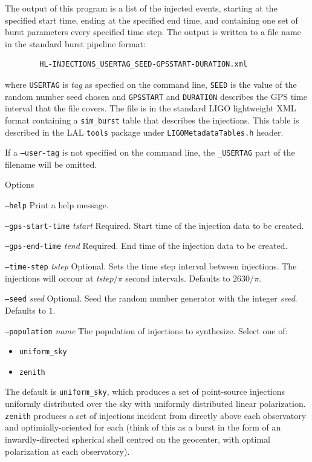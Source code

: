 \documentclass[10pt]{article}
\newcommand{\option}[1]{\texttt{#1}}
\newcommand{\parm}[1]{\textit{#1}}
\newenvironment{entry}%
{\begin{list}{}{\renewcommand{\makelabel}[1]%
{\parbox[b]{\labelwidth}{\makebox[0pt][l]{\textbf{##1}}\\}}%
\setlength{\labelwidth}{1em}%
\setlength{\labelsep}{1em}%
\setlength{\leftmargin}{2em}%
\setlength{\topsep}{\medskipamount}%
\setlength{\itemsep}{\medskipamount}%
\setlength{\parsep}{\medskipamount}%
\setlength{\listparindent}{0pt}}}
{\end{list}}
\begin{document}
\begin{entry}
The output of this program  is  a  list  of  the  injected events, starting
at  the specified start time, ending at the specified end time, and
containing one set  of burst parameters every specified time step.  The
output is written to a file name in the standard burst pipeline format:
\begin{center}
\begin{verbatim}
        HL-INJECTIONS_USERTAG_SEED-GPSSTART-DURATION.xml
\end{verbatim}
\end{center}
where \verb$USERTAG$ is \parm{tag} as specfied on the command line,
\verb$SEED$ is the  value  of  the random number seed chosen and
\verb$GPSSTART$ and \verb$DURATION$ describes the GPS time interval that
the file covers. The file is in the standard LIGO lightweight XML format
containing a \texttt{sim\_burst} table that describes the injections.  This
table is described in the LAL \texttt{tools} package under
\texttt{LIGOMetadataTables.h} header.  

If a \option{--user-tag} is not specified on the command line, the
\texttt{\_USERTAG} part of the filename will be omitted.

\item[Options]\leavevmode
\begin{entry}
\item[\option{--help}] Print a help message.

\item[\option{--gps-start-time} \parm{tstart}]
Required.  Start time of the injection data to be created.

\item[\option{--gps-end-time} \parm{tend}]
Required.  End time of the injection data to be created.

\item[\option{--time-step} \parm{tstep}]
Optional. Sets the time step interval between injections. The injections
will occour at \parm{tstep}$/\pi$ second intervals. Defaults to $2630/\pi$.

\item[\option{--seed} \parm{seed}]
Optional. Seed the random number generator with the integer \parm{seed}.
Defaults to $1$.

\item[\option{--population} \parm{name}]
The population of injections to synthesize.  Select one of:
\begin{itemize}
\item \texttt{uniform\_sky}
\item \texttt{zenith}
\end{itemize}
The default is \texttt{uniform\_sky}, which produces a set of point-source
injections uniformly distributed over the sky with uniformly distributed
linear polarization.  \texttt{zenith} produces a set of injections incident
from directly above each observatory and optimially-oriented for each
(think of this as a burst in the form of an inwardly-directed spherical
shell centred on the geocenter, with optimal polarization at each
observatory).


\end{entry}
\end{entry}
\end{document}
